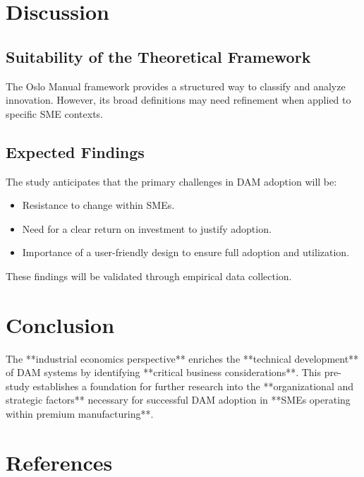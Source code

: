 \documentclass[a4paper,12pt,twocolumn]{article}
\begin{document}
\section{Discussion}
\subsection{Suitability of the Theoretical Framework}
The Oslo Manual framework provides a structured way to classify and analyze innovation. However, its broad definitions may need refinement when applied to specific SME contexts.

\subsection{Expected Findings}
The study anticipates that the primary challenges in DAM adoption will be:
\begin{itemize}
    \item Resistance to change within SMEs.
    \item Need for a clear return on investment to justify adoption.
    \item Importance of a user-friendly design to ensure full adoption and utilization.
\end{itemize}

These findings will be validated through empirical data collection.

\section{Conclusion}
The **industrial economics perspective** enriches the **technical development** of DAM systems by identifying **critical business considerations**.  
This pre-study establishes a foundation for further research into the **organizational and strategic factors** necessary for successful DAM adoption in **SMEs operating within premium manufacturing**.

\section{References}

\end{document}

